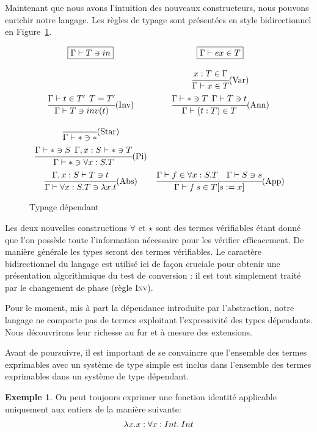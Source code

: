 \documentclass {article}
\theoremstyle{definition}
\newtheorem{example}{Exemple}
\theoremstyle{remark}
\begin{document}
Maintenant que nous avons l'intuition des nouveaux constructeurs, nous pouvons enrichir notre langage.
Les règles de typage sont présentées en style bidirectionnel en Figure~\ref{fig:typage dependant}.

\begin{figure}
  \[
  \begin{array}{cc}
  \boxed{\Gamma\vdash T \ni in}
  &
  \boxed{\Gamma\vdash ex \in T}
  \bigskip
  \\ 
  &
  \cfrac{x:T \in \Gamma}
        {\Gamma \vdash x \in T }\mbox{(Var)}
  \medskip
  \\
  \cfrac{\Gamma \vdash t \in T' \:\: T=T'}
        {\Gamma\vdash T \ni inv(t)}\mbox{(Inv)}
  &
  \cfrac{\Gamma\vdash * \ni T \:\:\Gamma\vdash T \ni t}
        {\Gamma\vdash (t:T) \in T}\mbox{(Ann)}
  \medskip
  \\
  \cfrac{}
        {\Gamma \vdash * \ni *}\mbox{(Star)} 
  \medskip
  \\
  \cfrac{\Gamma \vdash * \ni S\:\:\Gamma,x:S \vdash *\ni T}
        {\Gamma\vdash * \ni \forall x:S.T}\mbox{(Pi)}
  \medskip
  \\
  \cfrac{\Gamma,x:S\vdash T \ni t}
        {\Gamma \vdash \forall x:S.T \ni \lambda x. t}\mbox{(Abs)} 
  & 
  \cfrac{\Gamma \vdash f \in \forall x:S.T \quad \Gamma\vdash S \ni s }
        {\Gamma\vdash f\:s\in \subst{T}{s}{x}}\mbox{(App)} 
  \end{array}
  \]
  
  \caption{Typage dépendant}
  \label{fig:typage dependant} 
\end{figure}


Les deux nouvelles constructions $\forall$ et
$\star$ sont des termes vérifiables étant donné que l'on possède
toute l'information nécessaire pour les vérifier efficacement. De
manière générale les types seront des termes vérifiables.  Le caractère
bidirectionnel du langage est utilisé ici de façon cruciale
pour obtenir une présentation algorithmique du test de conversion : il
est tout simplement traité par le changement de phase (règle
\textsc{Inv}).

Pour le moment, mis à part la dépendance introduite par l'abstraction, notre langage ne comporte pas de termes exploitant 
l'expressivité des types dépendants. Nous découvrirons leur richesse au fur et à mesure des extensions.

Avant de poursuivre, il est important de se convaincre que l'ensemble des termes exprimables avec un système 
de type simple est inclus dans l'ensemble des termes exprimables dans un système de type dépendant.
\begin{example}
  On peut toujours exprimer une fonction identité applicable uniquement aux entiers de la manière suivante:
  \begin{align*}
    &\lambda x. x : \forall x:Int.\: Int \\
  \end{align*}
\end{example}
\end{document}
